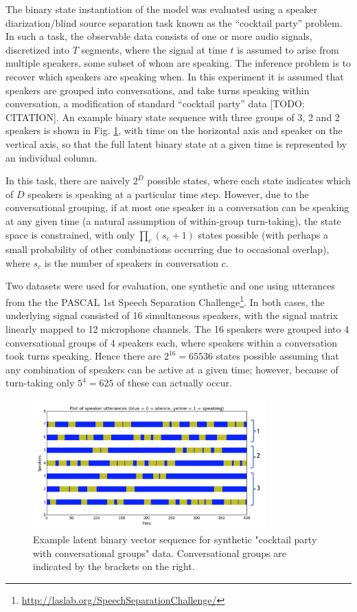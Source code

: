 The binary state instantiation of the model was evaluated using a speaker
diarization/blind source separation task known as the ``cocktail party'' problem.  
In such a task, the observable data consists of one or more audio
signals, discretized into $T$ segments, where the signal at time $t$
is assumed to arise from multiple speakers, some subset of whom are
speaking.  The inference problem is to recover which speakers are
speaking when.  In this experiment it is assumed that speakers are grouped into
conversations, and take turns speaking within conversation, a
modification of standard ``cocktail party'' data [TODO: CITATION].  
An example binary state sequence with three groups of
3, 2 and 2 speakers is shown in Fig. \ref{fig:cocktail-binary-sequences}, with time on the
horizontal axis and speaker on the vertical axis, so that the full latent
binary state at a given time is represented by an individual column.

In this task, there are naively $2^D$ possible states, where each state
indicates which of $D$ speakers is speaking
at a particular time step.  However, due to the conversational grouping, if
at most one speaker in a conversation can be speaking at any given
time (a natural assumption of within-group turn-taking), 
the state space is constrained, with only $\prod_c (s_c + 1)$
states possible (with perhaps a small probability of other
combinations occurring due to occasional overlap), where $s_c$ is the 
number of speakers in conversation $c$.

Two datasets were used for evaluation, one synthetic and one using
utterances from the the PASCAL 1st Speech Separation
Challenge\footnote{\url{http://laslab.org/SpeechSeparationChallenge/}}.
In both cases, the underlying signal consisted of 16 simultaneous speakers, with the
signal matrix linearly mapped to 12 microphone channels.
The 16 speakers were grouped into 4 conversational groups of 4
speakers each, where speakers within a conversation took turns
speaking.   Hence there are $2^{16} = 65536$ states possible assuming
that any combination of speakers can be active at a given time;
however, because of turn-taking only $5^4 = 625$ of these can actually
occur.

\begin{figure}[t]
  \centering
  \includegraphics[width=0.8\textwidth]{fig/cocktail-with-groups.png}
  \caption{Example latent binary vector sequence for synthetic
    "cocktail party with conversational groups" data.  Conversational
    groups are indicated by the brackets on the right.}
  \label{fig:cocktail-binary-sequences}
\end{figure}

